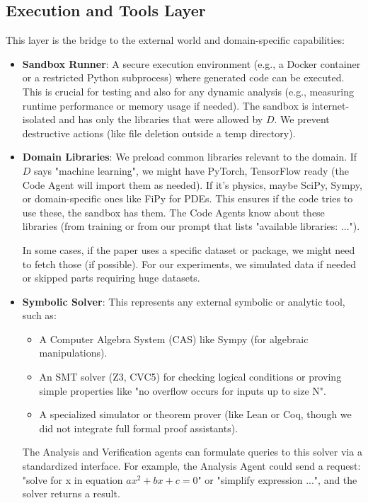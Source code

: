 \documentclass{ieeeaccess}
\begin{document}
\subsection{Execution and Tools Layer}
This layer is the bridge to the external world and domain-specific capabilities:
\begin{itemize}
\item \textbf{Sandbox Runner}: A secure execution environment (e.g., a Docker container or a restricted Python subprocess) where generated code can be executed. This is crucial for testing and also for any dynamic analysis (e.g., measuring runtime performance or memory usage if needed). The sandbox is internet-isolated and has only the libraries that were allowed by $D$. We prevent destructive actions (like file deletion outside a temp directory).

\item \textbf{Domain Libraries}: We preload common libraries relevant to the domain. If $D$ says "machine learning", we might have PyTorch, TensorFlow ready (the Code Agent will import them as needed). If it's physics, maybe SciPy, Sympy, or domain-specific ones like FiPy for PDEs. This ensures if the code tries to use these, the sandbox has them. The Code Agents know about these libraries (from training or from our prompt that lists "available libraries: ...").

In some cases, if the paper uses a specific dataset or package, we might need to fetch those (if possible). For our experiments, we simulated data if needed or skipped parts requiring huge datasets.

\item \textbf{Symbolic Solver}: This represents any external symbolic or analytic tool, such as:
\begin{itemize}
    \item A Computer Algebra System (CAS) like Sympy (for algebraic manipulations).
    \item An SMT solver (Z3, CVC5) for checking logical conditions or proving simple properties like "no overflow occurs for inputs up to size N".
    \item A specialized simulator or theorem prover (like Lean or Coq, though we did not integrate full formal proof assistants).
\end{itemize}
The Analysis and Verification agents can formulate queries to this solver via a standardized interface. For example, the Analysis Agent could send a request: "solve for x in equation $ax^2 + bx + c = 0$" or "simplify expression ...", and the solver returns a result.


\end{itemize}
\end{document}
